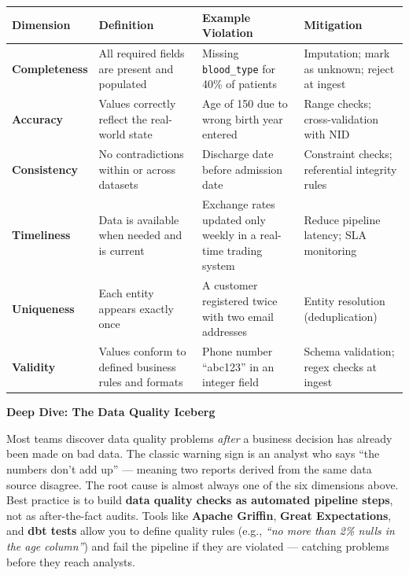 \documentclass[12pt,a4paper]{article}
\newcommand{\deepdivebox}[2]{%
  \noindent
  \colorbox{PUOrange!12}{%
    \begin{minipage}{\dimexpr\linewidth-2\fboxsep}
      \vspace{4pt}\textbf{\textcolor{PUOrange!80!black}{Deep Dive: #1}}\par\vspace{2pt}
      #2\vspace{4pt}
    \end{minipage}%
  }\par\vspace{6pt}%
}
\begin{document}
\begin{center}
\renewcommand{\arraystretch}{1.55}
\begin{tabular}{p{2.6cm}p{4.2cm}p{3.5cm}p{2.5cm}}
  \toprule
  \textbf{Dimension} & \textbf{Definition} & \textbf{Example Violation} & \textbf{Mitigation} \\
  \midrule
  \textbf{Completeness} &
    All required fields are present and populated &
    Missing \texttt{blood\_type} for 40\% of patients &
    Imputation; mark as unknown; reject at ingest \\
  \textbf{Accuracy} &
    Values correctly reflect the real-world state &
    Age of 150 due to wrong birth year entered &
    Range checks; cross-validation with NID \\
  \textbf{Consistency} &
    No contradictions within or across datasets &
    Discharge date before admission date &
    Constraint checks; referential integrity rules \\
  \textbf{Timeliness} &
    Data is available when needed and is current &
    Exchange rates updated only weekly in a real-time trading system &
    Reduce pipeline latency; SLA monitoring \\
  \textbf{Uniqueness} &
    Each entity appears exactly once &
    A customer registered twice with two email addresses &
    Entity resolution (deduplication) \\
  \textbf{Validity} &
    Values conform to defined business rules and formats &
    Phone number ``abc123'' in an integer field &
    Schema validation; regex checks at ingest \\
  \bottomrule
\end{tabular}
\end{center}

\deepdivebox{The Data Quality Iceberg}{Most teams discover data quality problems \textit{after} a business decision has already been made on bad data.  The classic warning sign is an analyst who says ``the numbers don't add up'' --- meaning two reports derived from the same data source disagree.  The root cause is almost always one of the six dimensions above.  Best practice is to build \textbf{data quality checks as automated pipeline steps}, not as after-the-fact audits.  Tools like \textbf{Apache Griffin}, \textbf{Great Expectations}, and \textbf{dbt tests} allow you to define quality rules (e.g., \textit{``no more than 2\% nulls in the age column''}) and fail the pipeline if they are violated --- catching problems before they reach analysts.}
\end{document}
